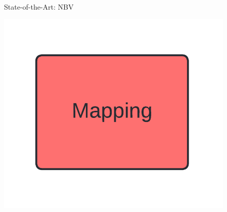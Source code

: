 \documentclass{beamer}
\begin{document}
\begin{frame}{State-of-the-Art: NBV}
\begin{textblock*}{0.2\textwidth}
		\includegraphics[width=\textwidth]{Graphics/mapping_flow.png}
	\end{textblock*}
\end{frame}
\end{document}
